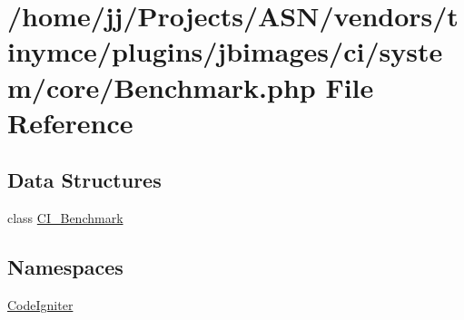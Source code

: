 \hypertarget{_benchmark_8php}{}\section{/home/jj/\+Projects/\+A\+S\+N/vendors/tinymce/plugins/jbimages/ci/system/core/\+Benchmark.php File Reference}
\label{_benchmark_8php}
\subsection*{Data Structures}
\begin{DoxyCompactItemize}
\item 
class \hyperlink{class_c_i___benchmark}{C\+I\+\_\+\+Benchmark}
\end{DoxyCompactItemize}
\subsection*{Namespaces}
\begin{DoxyCompactItemize}
\item 
 \hyperlink{namespace_code_igniter}{Code\+Igniter}
\end{DoxyCompactItemize}
